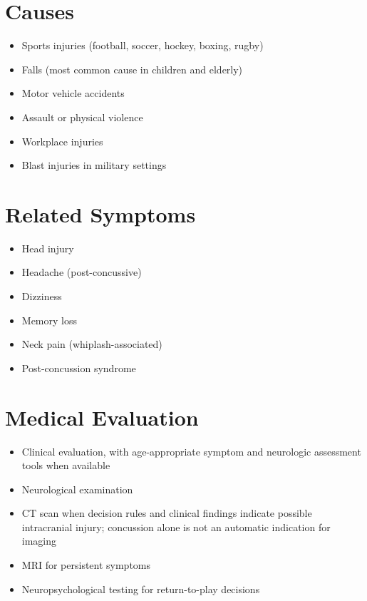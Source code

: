 \section*{Causes}
\begin{itemize}
\item Sports injuries (football, soccer, hockey, boxing, rugby)
\item Falls (most common cause in children and elderly)
\item Motor vehicle accidents
\item Assault or physical violence
\item Workplace injuries
\item Blast injuries in military settings
\end{itemize}

\section*{Related Symptoms}
\begin{itemize}
\item Head injury
\item Headache (post-concussive)
\item Dizziness
\item Memory loss
\item Neck pain (whiplash-associated)
\item Post-concussion syndrome
\end{itemize}

\section*{Medical Evaluation}
\begin{itemize}
 \item Clinical evaluation, with age-appropriate symptom and neurologic assessment tools when available
\item Neurological examination
 \item CT scan when decision rules and clinical findings indicate possible intracranial injury; concussion alone is not an automatic indication for imaging
\item MRI for persistent symptoms
\item Neuropsychological testing for return-to-play decisions
\end{itemize}

